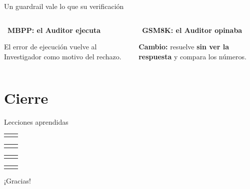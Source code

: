 \documentclass[aspectratio=1610, 11pt]{beamer}
\makeatletter
\newcommand{\leccion}[2]{%
  \begin{tabular}{@{}p{30mm}@{\hspace{3mm}}p{\dimexpr\textwidth-33mm\relax}@{}}
    \leavevmode{\color{cAcc}\fontsize{15}{17}\selectfont #1} &
    \hyphenpenalty=10000\raggedright\leavevmode{\small #2\par}
  \end{tabular}\par\vspace{2mm}}
\makeatother
\begin{document}
\begin{frame}{Un guardrail vale lo que su verificación}
  \begin{columns}[T,onlytextwidth]
    \begin{column}{0.47\textwidth}
      {\color{cAcc}\faCode}\ \textbf{MBPP: el Auditor ejecuta}\par\vspace{2mm}
      \vspace{2mm}
      {\footnotesize El error de ejecución vuelve al Investigador como motivo del rechazo.\par}
    \end{column}
    \begin{column}{0.49\textwidth}
      {\color{cAcc}\faCalculator}\ \textbf{GSM8K: el Auditor opinaba}\par\vspace{2mm}
      \par\vspace{2mm}
      {\footnotesize \textbf{Cambio:} resuelve \textbf{sin ver la respuesta} y compara los números.\par}
    \end{column}
  \end{columns}
\end{frame}

\section{Cierre}

\begin{frame}{Lecciones aprendidas}
  \vspace{2mm}
  \leccion{0 de 15}{Verificar ejecutando, no opinando.}
  \leccion{0.36 vs 0.78}{Medir con un juez independiente.}
  \leccion{6 de 50}{Abstenerse baja el promedio, pero evita errores.}
  \leccion{9 de 20}{Nombrar el idioma: el 7B respondía en español a preguntas en inglés.}
  \vfill
  {\fontsize{16}{19}\selectfont\color{cAcc}¡Gracias!}\ \ \par
  \vspace{1mm}
\end{frame}
\end{document}
